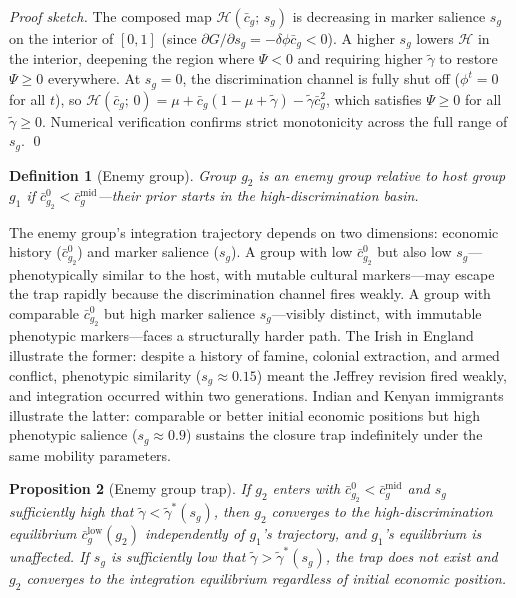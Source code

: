 \documentclass[12pt,a4paper]{article}
\newtheorem{proposition}{Proposition}
\newtheorem{definition}[proposition]{Definition}
\theoremstyle{definition}
\numberwithin{proposition}{subsection}
\begin{document}
\begin{proof}[Proof sketch]
The composed map $\mathcal{H}(\bar{c}_g;\, s_g)$ is decreasing in marker salience $s_g$ on the
interior of $[0,1]$ (since $\partial G/\partial s_g = -\delta\phi
\bar{c}_g < 0$). A higher $s_g$ lowers $\mathcal{H}$ in the interior, deepening
the region where $\Psi < 0$ and requiring higher $\tilde{\gamma}$ to
restore $\Psi \geq 0$ everywhere. At $s_g = 0$, the discrimination
channel is fully shut off ($\phi^t = 0$ for all $t$), so
$\mathcal{H}(\bar{c}_g;\, 0) = \mu + \bar{c}_g(1 - \mu + \tilde{\gamma}) -
\tilde{\gamma}\bar{c}_g^2$, which satisfies $\Psi \geq 0$ for all
$\tilde{\gamma} \geq 0$. Numerical verification confirms strict
monotonicity across the full range of $s_g$. \qed
\end{proof}

\begin{definition}[Enemy group]
Group $g_2$ is an enemy group relative to host group $g_1$ if
$\bar{c}_{g_2}^0 < \bar{c}_g^{\mathrm{mid}}$---their prior starts
in the high-discrimination basin.
\end{definition}

The enemy group's integration trajectory depends on two dimensions:
economic history ($\bar{c}_{g_2}^0$) and marker salience ($s_g$).
A group with low $\bar{c}_{g_2}^0$ but also low $s_g$---phenotypically
similar to the host, with mutable cultural markers---may escape
the trap rapidly because the discrimination channel fires weakly.
A group with comparable $\bar{c}_{g_2}^0$ but high marker salience $s_g$---visibly
distinct, with immutable phenotypic markers---faces a structurally
harder path. The Irish in England illustrate the former: despite a
history of famine, colonial extraction, and armed conflict,
phenotypic similarity ($s_g \approx 0.15$) meant the Jeffrey
revision fired weakly, and integration occurred within two
generations. Indian and Kenyan immigrants illustrate the latter:
comparable or better initial economic positions but high phenotypic
salience ($s_g \approx 0.9$) sustains the closure trap
indefinitely under the same mobility parameters.

\begin{proposition}[Enemy group trap]
\label{prop:enemy}
If $g_2$ enters with $\bar{c}_{g_2}^0 < \bar{c}_g^{\mathrm{mid}}$
and $s_g$ sufficiently high that $\tilde{\gamma} <
\tilde{\gamma}^*(s_g)$, then $g_2$ converges to the
high-discrimination equilibrium $\bar{c}_g^{\mathrm{low}}(g_2)$ independently
of $g_1$'s trajectory, and $g_1$'s equilibrium is unaffected.
If $s_g$ is sufficiently low that $\tilde{\gamma} >
\tilde{\gamma}^*(s_g)$, the trap does not exist and $g_2$
converges to the integration equilibrium regardless of initial
economic position.
\end{proposition}
\end{document}
